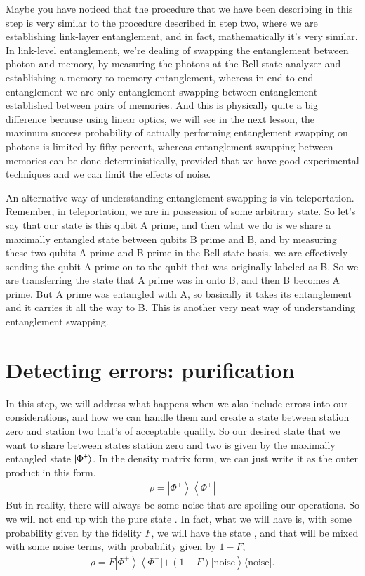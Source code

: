 Maybe you have noticed that the procedure that we have been describing in this step is very similar to the procedure described in step two, where we are establishing link-layer entanglement, and in fact, mathematically it's very similar. In link-level entanglement, we're dealing of swapping the entanglement between photon and memory, by measuring the photons at the Bell state analyzer and establishing a memory-to-memory entanglement, whereas in end-to-end entanglement we are only entanglement swapping between entanglement established between pairs of memories. And this is physically quite a big difference because using linear optics, we will see in the next lesson, the maximum success probability of actually performing entanglement swapping on photons is limited by fifty percent, whereas entanglement swapping between memories can be done deterministically, provided that we have good experimental techniques and we can limit the effects of noise.

An alternative way of understanding entanglement swapping is via teleportation. Remember, in teleportation, we are in possession of some arbitrary state. So let's say that our state is this qubit A prime, and then what we do is we share a maximally entangled state between qubits B prime and B, and by measuring these two qubits A prime and B prime in the Bell state basis, we are effectively sending the qubit A prime on to the qubit that was originally labeled as B. So we are transferring the state that A prime was in onto B, and then B becomes A prime. But A prime was entangled with A, so basically it takes its entanglement and it carries it all the way to B. This is another very neat way of understanding entanglement swapping.

\section{Detecting errors: purification}
\label{sec:purification}


In this step, we will address what happens when we also include errors into our considerations, and how we can handle them and create a state between station zero and station two that's of acceptable quality. So our desired state that we want to share between states station zero and two is given by the maximally entangled state $\left| \Phi^+ \right\rangle$. In the density matrix form, we can just write it as the outer product in this form. 
\begin{align}
    \rho=\left|\Phi^{+}\right\rangle\left\langle\Phi^{+}\right|
\end{align}
But in reality, there will always be some noise that are spoiling our operations. So we will not end up with the pure state  \ket{\Phi^+}. In fact, what we will have is, with some probability given by the fidelity $F$, we will have the state  \ket{\Phi^+}, and that will be mixed with some noise terms, with probability given by $1-F$, 
\begin{align}
    \rho=F\left|\Phi^{+}\right\rangle\left\langle\Phi^{+}|+(1-F)| \text {noise}\right\rangle\langle\text {noise}|.
\end{align}

